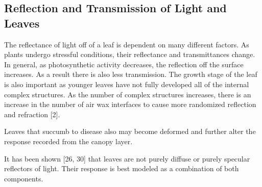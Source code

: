 \subsection{Reflection and Transmission of Light and Leaves}

The reflectance of light off of a leaf is dependent on many different factors.  As plants undergo stressful conditions, their reflectance and transmittances change.  In general, as photosynthetic activity decreases, the reflection off the surface increases.  As a result there is also less transmission.  The growth stage of the leaf is also important as younger leaves have not fully developed all of the internal complex structures.  As the number of complex structures increases, there is an increase in the number of air wax interfaces to cause more randomized reflection and refraction [2].

Leaves that succumb to disease also may become deformed and further alter the response recorded from the canopy layer.

It has been shown [26, 30] that leaves are not purely diffuse or purely specular reflectors of light.  Their response is best modeled as a combination of both components.
